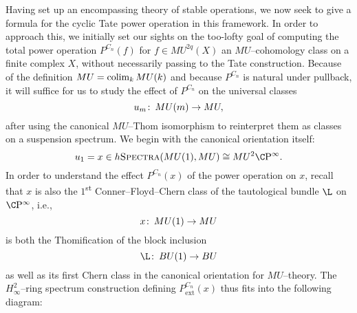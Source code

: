 Having set up an encompassing theory of stable operations, we now seek to give a formula for the cyclic Tate power operation in this framework.  In order to approach this, we initially set our sights on the too-lofty goal of computing the total power operation \(P^{C_n}(f)\) for \(f \in MU^{2q}(X)\) an \(MU\)--cohomology class on a finite complex \(X\), without necessarily passing to the Tate construction.  Because of the definition \(MU = \operatorname*{colim}_k MU(k)\) and because \(P^{C_n}\) is natural under pullback, it will suffice for us to study the effect of \(P^{C_n}\) on the universal classes \[u_m\colon\thinspace MU(m) \to MU,\] after using the canonical \(MU\)--Thom isomorphism to reinterpret them as classes on a suspension spectrum.  We begin with the canonical orientation itself: \[u_1 = x \in h\CatOf{Spectra}(MU(1), MU) \cong MU^2 \CP^\infty.\]  In order to understand the effect \(P^{C_n}(x)\) of the power operation on \(x\), recall that \(x\) is also the \(1\)\textsuperscript{st} Conner--Floyd--Chern class of the tautological bundle \(\L\) on \(\CP^\infty\), i.e., \[x\colon\thinspace MU(1) \to MU\] is both the Thomification of the block inclusion \[\L\co BU(1) \to BU\] as well as its first Chern class in the canonical orientation for \(MU\)--theory.  The \(H_\infty^2\)--ring spectrum construction defining \(P^{C_n}_{\mathrm{ext}}(x)\) thus fits into the following diagram:
\begin{center}
\end{center}
